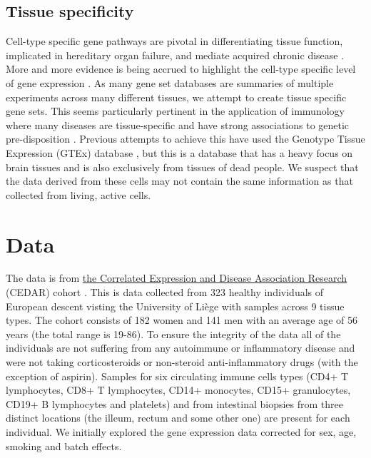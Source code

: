 \documentclass[11pt]{article} %
\begin{document}
	\subsection{Tissue specificity}
	Cell-type specific gene pathways are pivotal in differentiating tissue function, implicated in hereditary organ failure, and mediate acquired chronic disease \cite{ju_defining_2013}. More and more evidence is being accrued to highlight the cell-type specific level of gene expression \cite{grundberg_mapping_2012}\cite{ong_enhancer_2011}\cite{maniatis_regulation_1987}. As many gene set databases are summaries of multiple experiments across many different tissues, we attempt to create tissue specific gene sets. This seems particularly pertinent in the application of immunology where many diseases are tissue-specific and have strong associations to genetic pre-disposition \cite{vyse_genetic_1996}\cite{maas_cutting_2002}\cite{aune_co-localization_2004}\cite{botstein_discovering_2003}. Previous attempts to achieve this have used the Genotype Tissue Expression (GTEx) database \cite{gtex_consortium_genetic_2017}, but this is a database that has a heavy focus on brain tissues and is also exclusively from tissues of dead people. We suspect that the data derived from these cells may not contain the same information as that collected from living, active cells. 

	\section{Data}
	The data is from \href{http://139.165.108.18/srv/genmol/permanent/1be6993fe41c12a051c9244d67c91da2be49e5dd26a6cd79f442bc006971e2ef/crohn-index.html}
	{the Correlated Expression and Disease Association Research} (CEDAR) cohort \cite{the_international_ibd_genetics_consortium_ibd_2018}. This is 
	data collected from 323 healthy individuals of European descent visting the University of Li\`ege with 
	samples across 9 tissue types. The cohort consists of 182 women and 141 men with an average age of 56 
	years (the total range is 19-86). To ensure the integrity of the data all of the individuals are not 
	suffering from any autoimmune or inflammatory disease and were not taking corticosteroids or non-steroid 
	anti-inflammatory drugs (with the exception of aspirin). Samples for six circulating immune cells types
	(CD4+ T lymphocytes, CD8+ T lymphocytes, CD14+ monocytes, CD15+ granulocytes, CD19+ B lymphocytes and 
	platelets) and from intestinal biopsies from three distinct locations (the illeum, rectum and 
	some other one) are present for each individual. We initially explored the gene expression data 
	corrected for sex, age, smoking and batch effects.

	
	
	
\end{document}
